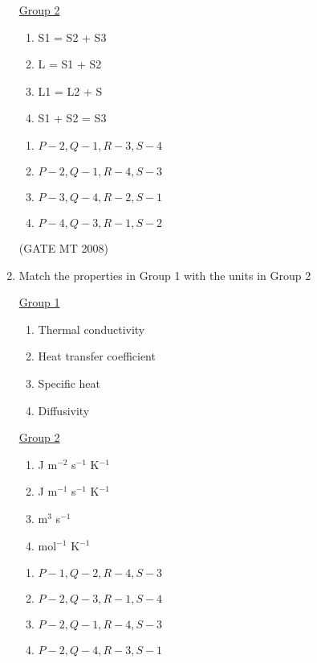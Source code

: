 \documentclass[journal, 11pt, onecolumn]{IEEEtran}
\theoremstyle{remark}
\begin{document}
\begin{enumerate}
\begin{multicols}{2}
\underline{Group 2}
\begin{enumerate}[label=(\arabic*), start=1]
\item S1 = S2 + S3
\item L = S1 + S2
\item L1 = L2 + S
\item S1 + S2 = S3
\end{enumerate}
\end{multicols}

\begin{multicols}{2}
\begin{enumerate} 
\item $P-2, Q-1, R-3, S-4$
\item $P-2, Q-1, R-4, S-3$
\item $P-3, Q-4, R-2, S-1$
\item $P-4, Q-3, R-1, S-2$
\end{enumerate}
\end{multicols}

\hfill(GATE MT 2008)

\item Match the properties in Group 1 with the units in Group 2
\begin{multicols}{2}
\underline{Group 1}
\begin{enumerate}[label=(\Alph*), start=16]
\item Thermal conductivity
\item Heat transfer coefficient 
\item Specific heat
\item Diffusivity 
\end{enumerate}

\underline{Group 2}
\begin{enumerate}[label=(\arabic*), start=1]
\item J m$^{-2}$ s$^{-1}$ K$^{-1}$
\item J m$^{-1}$ s$^{-1}$ K$^{-1}$ 
\item m$^3$ s$^{-1}$
\item mol$^{-1}$ K$^{-1}$
\end{enumerate}
\end{multicols}

\begin{multicols}{2}
\begin{enumerate} 
\item $P-1, Q-2, R-4, S-3$
\item $P-2, Q-3, R-1, S-4$
\item $P-2, Q-1, R-4, S-3$
\item $P-2, Q-4, R-3, S-1$
\end{enumerate}
\end{multicols}


\end{enumerate}
\end{document}
